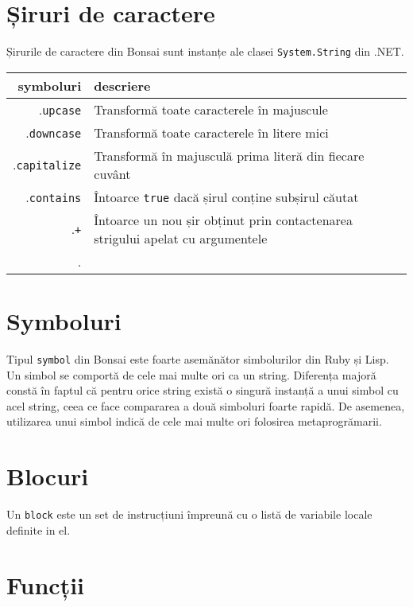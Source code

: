 \documentclass[12pt,a4paper]{memoir}
\begin{document}
\section{Șiruri de caractere}

Șirurile de caractere din Bonsai sunt instanțe ale clasei \texttt{System.String} din .NET.

\begin{tabular} { | r | l | }
  \hline
  symboluri & descriere \\
  \hline
  .\texttt{upcase} & Transformă toate caracterele în majuscule \\
  .\texttt{downcase} & Transformă toate caracterele în litere mici \\
  .\texttt{capitalize} & Transformă în majusculă prima literă din fiecare cuvânt \\
  .\texttt{contains} & Întoarce \texttt{true} dacă șirul conține subșirul căutat \\
  .\texttt{+} & Întoarce un nou șir obținut prin contactenarea strigului apelat cu argumentele \\
  .\texttt{} &  \\
  \hline
\end{tabular}

\section{Symboluri}

Tipul \texttt{symbol} din Bonsai este foarte asemănător simbolurilor din Ruby\cite{ruby_symbols} și Lisp\cite{clhs_symbols}. Un simbol se comportă de cele mai multe ori ca un string. Diferența majoră constă în faptul că pentru orice string există o singură instanță a unui simbol cu acel string, ceea ce face compararea a două simboluri foarte rapidă. De asemenea, utilizarea unui simbol indică de cele mai multe ori folosirea metaprogrămarii.

\section{Blocuri}

Un \texttt{block} este un set de instrucțiuni împreună cu o listă de variabile locale definite in el. 


\section{Funcții}
\end{document}

